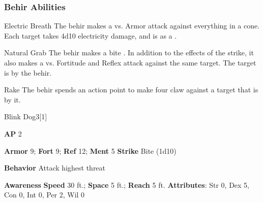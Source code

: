 \subsubsection{Behir Abilities}

\begin{ability}{Electric Breath}
The behir makes a  vs. Armor attack against everything in a \areamed cone.
\hit Each target takes 4d10 electricity damage, and is  as a .
\end{ability}

\vspace{0.5em}
\begin{ability}{Natural Grab}
The behir makes a bite .
In addition to the effects of the strike, it also makes a  vs. Fortitude and Reflex attack against the same target.
\hit The target is  by the behir.
\end{ability}

\vspace{0.5em}
\begin{ability}{Rake}
The behir spends an action point to make four claw  against a target that is  by it.
\end{ability}

\begin{monsection}{Blink Dog}{3}[1]
\vspace{-1em}\vspace{-1em}
\begin{spellcontent}
\begin{spelltargetinginfo}
{\textbf{AP} 2}

\pari \textbf{Armor} 9;
\textbf{Fort} 9;
\textbf{Ref} 12;
\textbf{Ment} 5
\pari \textbf{Strike} Bite  (1d10)



\pari \textbf{Behavior} Attack highest threat
\end{spelltargetinginfo}
\end{spellcontent}

\begin{monsterfooter}
\pari \textbf{Awareness} 
\pari \textbf{Speed} 30 ft.;
\textbf{Space} 5 ft.;
\textbf{Reach} 5 ft.
\pari \textbf{Attributes}:
Str 0,
Dex 5,
Con 0,
Int 0,
Per 2,
Wil 0
\end{monsterfooter}
\end{monsection}


